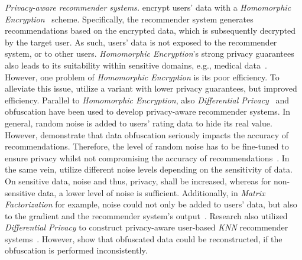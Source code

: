 \documentclass[manuscript,review,anonymous]{acmart}
\begin{document}
\vspace{2mm} \noindent \emph{Privacy-aware recommender systems.}
\cite{badsha2017privacy} encrypt users' data with a \emph{Homomorphic Encryption}~\cite{gentry2009fully} scheme.
Specifically, the recommender system generates recommendations based on the encrypted data, which is subsequently decrypted by the target user.
As such, users' data is not exposed to the recommender system, or to other users.
\emph{Homomorphic Encryption}'s strong privacy guarantees also leads to its suitability within sensitive domains, e.g., medical data~\cite{zhang2021privacy}.
However, one problem of \emph{Homomorphic Encryption} is its poor efficiency.
To alleviate this issue, \cite{tang2016privacy,kikuchi2012accuracy} utilize a variant with lower privacy guarantees, but improved efficiency.
Parallel to \emph{Homomorphic Encryption}, also \emph{Differential Privacy}~\cite{dwork2014algorithmic} and obfuscation have been used to develop privacy-aware recommender systems.
In general, random noise is added to users' rating data to hide its real value.
However, \cite{berkovsky2012impact} demonstrate that data obfuscation seriously impacts the accuracy of recommendations.
Therefore, the level of random noise has to be fine-tuned to ensure privacy whilst not compromising the accuracy of recommendations~\cite{mcsherry2009differentially}.
In the same vein, \cite{meng2018personalized} utilize different noise levels depending on the sensitivity of data.
On sensitive data, noise and thus, privacy, shall be increased, whereas for non-sensitive data, a lower level of noise is sufficient.
Additionally, in \emph{Matrix Factorization} for example, noise could not only be added to users' data, but also to the gradient and the recommender system's output~\cite{berlioz2015applying}.
Research also utilized \emph{Differential Privacy} to construct privacy-aware user-based \emph{KNN} recommender systems~\cite{lu2015security,zhu2014effective}.
However, \cite{okkalioglu2016reconstructing} show that obfuscated data could be reconstructed, if the obfuscation is performed inconsistently.
\end{document}

